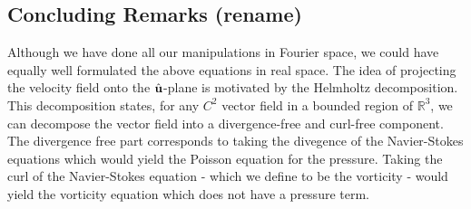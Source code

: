 \subsection{Concluding Remarks (rename)}
Although we have done all our manipulations in Fourier space, we could have equally well formulated the above equations in real space. The idea of projecting the velocity field onto the $\hat{\textbf{u}}$-plane is motivated by the Helmholtz decomposition. This decomposition states, for any $C^{2}$ vector field in a bounded region of $\mathbb{R}^{3}$, we can decompose the vector field into a divergence-free and curl-free component. The divergence free part corresponds to taking the divegence of the Navier-Stokes equations which would yield the Poisson equation for the pressure. Taking the curl of the Navier-Stokes equation - which we define to be the vorticity - would yield the vorticity equation which does not have a pressure term. 

